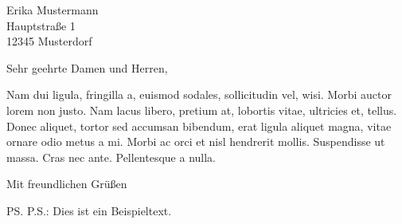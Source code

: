 \documentclass[
11pt,
a4paper,
parskip=half,
DIV=10
]{scrlttr2}
\date{30. Juni 2020}
\begin{document}
	
	\begin{letter}{%
			Erika Mustermann\\
			Hauptstraße 1\\
			12345 Musterdorf
		}
		
		\opening{Sehr geehrte Damen und Herren,}
		
		Nam dui ligula, fringilla a, euismod sodales, sollicitudin vel, wisi. Morbi auctor lorem non justo. Nam lacus libero, pretium at, lobortis vitae, ultricies et, tellus. Donec aliquet, tortor sed accumsan bibendum, erat ligula aliquet magna, vitae ornare odio metus a mi. Morbi ac orci et nisl hendrerit mollis. Suspendisse ut massa. Cras nec ante. Pellentesque a nulla.
		
		\closing{Mit freundlichen Grüßen}
		
		\ps{P.S.: Dies ist ein Beispieltext.} %
		
		
	\end{letter}
	
\end{document}
